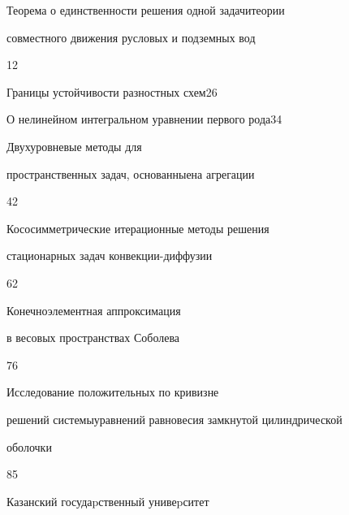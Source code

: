

{Теорема о единственности решения одной задачи\newline теории


совместного движения русловых и подземных вод}{12}




{Границы устойчивости разностных схем}{26}




{О нелинейном интегральном уравнении первого рода}{34}




{Двухуровневые методы для


пространственных задач, основанные\newline на агрегации}{42}




{Кососимметрические итерационные методы решения\newline


стационарных задач конвекции-диффузии}{62}




{Конечноэлементная аппроксимация 


в весовых пространствах Соболева}{76}




{Исследование положительных по кривизне


решений системы\newline уравнений равновесия замкнутой цилиндрической


оболочки}{85}








\vfill


\noindent\raisebox{2pt}{\copyright} Казанский госудаpственный унивеpситет






